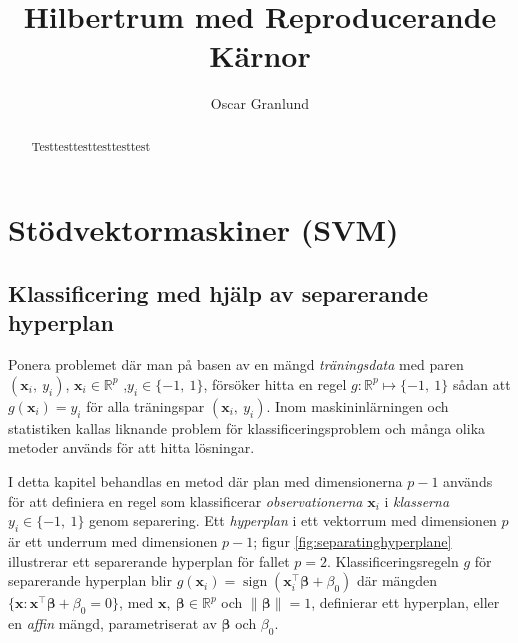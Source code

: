 \documentclass[a4paper, 12pt]{report}
\title{Hilbertrum med Reproducerande Kärnor}
\author{Oscar Granlund}
\DeclareMathOperator{\sign}{sign}
\theoremstyle{definition}
\newcommand{\bfbeta}{\boldsymbol{\beta}}
\begin{document}
\maketitle

\begin{abstract}
	Testtesttesttesttesttest
\end{abstract}

\chapter{Stödvektormaskiner (SVM)}

\section{Klassificering med hjälp av separerande hyperplan}
Ponera problemet där man på basen av en mängd \textit{träningsdata} med paren $(\mathbf{x}_i,~y_i)$, $\mathbf{x}_i\in\mathbb{R}^p$ ,$y_i\in \{-1,~1\}$, försöker hitta en regel $g: \mathbb{R}^p \longmapsto \{-1,~1\}$ sådan att $g(\mathbf{x}_i)=y_i$ för alla träningspar $(\mathbf{x}_i,~y_i)$. Inom maskininlärningen och statistiken kallas liknande problem för klassificeringsproblem och många olika metoder används för att hitta lösningar. 

I detta kapitel behandlas en metod där plan med dimensionerna $p-1$ används för att definiera en regel som klassificerar \textit{observationerna} $\mathbf{x}_i$ i \textit{klasserna} $y_i\in\{-1,~1\}$ genom separering. Ett \textit{hyperplan} i ett vektorrum med dimensionen $p$ är ett underrum med dimensionen $p-1$; figur \ref{fig:separatinghyperplane} illustrerar ett separerande hyperplan för fallet $p=2$. Klassificeringsregeln $g$ för separerande hyperplan blir $g(\mathbf{x}_i)=\sign (\mathbf{x}_i^\intercal    \bfbeta + \beta_0)$ där mängden $\{\mathbf{x}: \mathbf{x}^\intercal \bfbeta + \beta_0=0\}$, med $\mathbf{x},~\bfbeta\in \mathbb{R}^p$ och $\|\bfbeta\|=1$, definierar ett hyperplan, eller en \textit{affin} mängd, parametriserat av $\boldsymbol\beta$ och $\beta_0$.
\end{document}
